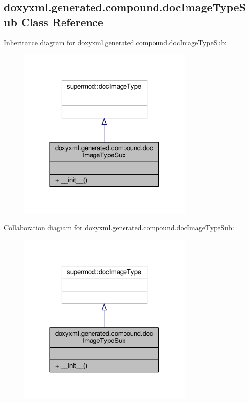 \subsection{doxyxml.\+generated.\+compound.\+doc\+Image\+Type\+Sub Class Reference}
\label{classdoxyxml_1_1generated_1_1compound_1_1docImageTypeSub}


Inheritance diagram for doxyxml.\+generated.\+compound.\+doc\+Image\+Type\+Sub\+:
\nopagebreak
\begin{figure}[H]
\begin{center}
\leavevmode
\includegraphics[width=246pt]{d3/d7c/classdoxyxml_1_1generated_1_1compound_1_1docImageTypeSub__inherit__graph}
\end{center}
\end{figure}


Collaboration diagram for doxyxml.\+generated.\+compound.\+doc\+Image\+Type\+Sub\+:
\nopagebreak
\begin{figure}[H]
\begin{center}
\leavevmode
\includegraphics[width=246pt]{db/d73/classdoxyxml_1_1generated_1_1compound_1_1docImageTypeSub__coll__graph}
\end{center}
\end{figure}

